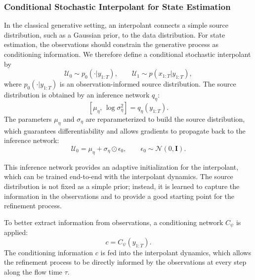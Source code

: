 \subsubsection{Conditional Stochastic Interpolant for State Estimation}
In the classical generative setting, an interpolant connects a simple source distribution, such as a Gaussian prior, to the data distribution. For state estimation, the observations should constrain the generative process as conditioning information. We therefore define a conditional stochastic interpolant by
\begin{equation}
    \mathcal{U}_0 \sim p_0(\cdot | y_{1:T}), \qquad
    \mathcal{U}_1 \sim p(x_{1:T}| y_{1:T}),
\end{equation}
where $p_0(\cdot | y_{1:T})$ is an observation-informed source distribution. The source distribution is obtained by an inference network $q_\eta$:
\begin{equation}
    \left[\mu_\eta,\,\log \sigma_\eta^2\right]
    =
    q_\eta(y_{1:T}).
    \label{eq:conditional_stochastic_interpolant_encoder}
\end{equation}
The parameters $\mu_\eta$ and $\sigma_\eta$ are reparameterized to build the source distribution, which guarantees differentiability and allows gradients to propagate back to the inference network:
\begin{equation}
    \mathcal{U}_0 = \mu_\eta + \sigma_\eta \odot \epsilon_0,
    \qquad
    \epsilon_0 \sim \mathcal{N}(0, \boldsymbol{I}).
    \label{eq:conditional_stochastic_interpolant_source}
\end{equation} 

This inference network provides an adaptive initialization for the interpolant, which can be trained end-to-end with the interpolant dynamics. The source distribution is not fixed as a simple prior; instead, it is learned to capture the information in the observations and to provide a good starting point for the refinement process.

To better extract information from observations, a conditioning network $C_\psi$ is applied:
\begin{equation}
    c = C_\psi(y_{1:T}).
\end{equation} 
The conditioning information $c$ is fed into the interpolant dynamics, which allows the refinement process to be directly informed by the observations at every step along the flow time $\tau$.

